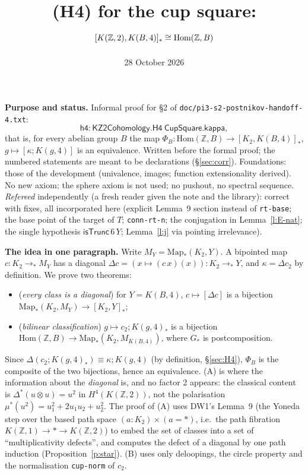 \documentclass[11pt]{amsart}
\title{(H4) for the cup square: $\hc{K(\Z,2)}{K(B,4)}\cong\Hom(\Z,B)$}
\date{28 October 2026}
\theoremstyle{definition}
\theoremstyle{remark}
\newcommand{\Map}{\mathrm{Map}_*}
\newcommand{\Z}{\mathbb{Z}}
\newcommand{\code}[1]{\texttt{#1}}
\newcommand{\cT}{\mathsf{isTrunc}}
\newcommand{\Hom}{\mathrm{Hom}}
\newcommand{\hc}[2]{[#1,#2]_*}
\begin{document}
\maketitle

\noindent\textbf{Purpose and status.} Informal proof for \S2 of
\code{doc/pi3-s2-postnikov-handoff-4.txt}:
\[\mathsf{h4}:\mathsf{KZ2Cohomology.H4}\ \mathsf{CupSquare.kappa},\]
that is, for every abelian group $B$ the map
$\Phi_B:\Hom(\Z,B)\to\hc{K_2}{K(B,4)}$, $g\mapsto[\kappa;K(g,4)]$ is an
equivalence. Written before the formal proof; the numbered statements are
meant to be declarations (\S\ref{sec:corr}). Foundations: those of the
development (univalence, images; function extensionality derived). No new
axiom; the sphere axiom is not used; no pushout, no spectral sequence. \emph{Refereed} independently (a fresh
reader given the note and the library): correct with fixes, all
incorporated here (explicit Lemma~9 section instead of \code{rt-base}; the
base point of the target of $T$; \code{conn-rt-n}; the conjugation in
Lemma~\ref{l:E-nat}; the single hypothesis $\cT\,6\,Y$; Lemma~\ref{l:j} via
pointing irrelevance).

\smallskip\noindent\textbf{The idea in one paragraph.} Write
$M_Y=\Map(K_2,Y)$. A bipointed map $c:K_2\to_*M_Y$ has a diagonal
$\Delta c=(x\mapsto(c\,x)(x)):K_2\to_*Y$, and $\kappa=\Delta c_2$ by
definition. We prove two theorems:
\begin{itemize}
\item[(A)] (\emph{every class is a diagonal}) for $Y=K(B,4)$,
  $c\mapsto[\Delta c]$ is a bijection $\Map(K_2,M_Y)\to\hc{K_2}{Y}$;
\item[(B)] (\emph{bilinear classification}) $g\mapsto c_2;K(g,4)_*$ is a
  bijection $\Hom(\Z,B)\to\Map(K_2,M_{K(B,4)})$, where $G_*$ is
  postcomposition.
\end{itemize}
Since $\Delta(c_2;K(g,4)_*)\equiv\kappa;K(g,4)$ (by definition, \S\ref{sec:H4}),
$\Phi_B$ is the composite of the two bijections, hence an equivalence.
(A) is where the information about the \emph{diagonal} is, and no factor 2
appears: the classical content is $\Delta^*(u\otimes u)=u^2$ in
$H^4(K(\Z,2))$, not the polarisation $\mu^*(u^2)=u_1^2+2u_1u_2+u_2^2$. The
proof of (A) uses DW1's Lemma~9 (the Yoneda step over the based path
space $(a:K_2)\times(a=*)$, i.e.\ the path fibration
$K(\Z,1)\to *\to K(\Z,2)$) to embed the set of classes into a set of
``multiplicativity defects'', and computes the defect of a diagonal by
one path induction (Proposition~\ref{p:star}). (B) uses only deloopings,
the circle property and the normalisation \code{cup-norm} of $c_2$.
\end{document}
